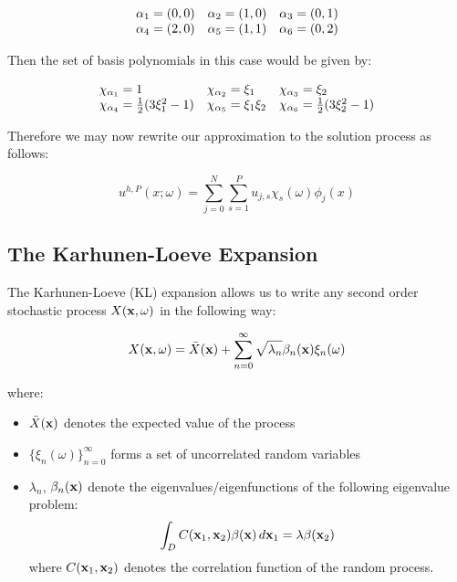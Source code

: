 \begin{equation}
  \begin{array}{c c c }
    \alpha_1 = (0,0) & \alpha_2 = (1,0) & \alpha_3 = (0,1) \\
    \alpha_4 = (2,0) & \alpha_5 = (1,1) & \alpha_6 = (0,2)
  \end{array}
\end{equation}

Then the set of basis polynomials in this case would be given by:

\begin{equation}
  \begin{array}{l l l}
    \chi_{\alpha_1} = 1 & \chi_{\alpha_2} = \xi_1 & \chi_{\alpha_3} = \xi_2 \\
    \chi_{\alpha_4} = \frac{1}{2}(3\xi_1^2 - 1) &
    \chi_{\alpha_5} = \xi_1\xi_2 &
    \chi_{\alpha_6} = \frac{1}{2}(3\xi_2^2 - 1)
  \end{array}
\end{equation}

Therefore we may now rewrite our approximation to the solution process
 as follows:

\begin{equation}\label{eq:oned-stochastic-uhp}
    u^{h,P}(x;\omega) = \sum_{j=0}^N\sum_{s=1}^Pu_{j,s}\chi_s(\omega)\phi_j(x)
\end{equation}

\subsection{The Karhunen-Loeve Expansion}

The Karhunen-Loeve (KL) expansion allows us to write any second order
stochastic process $X(\mathbf{x},\omega)$ in the following way:

\begin{equation}
    X(\mathbf{x}, \omega) = \bar{X}(\mathbf{x})
    + \sum_{n = 0}^\infty\sqrt{\lambda_n}\beta_n(\mathbf{x})\xi_n(\omega)
\end{equation}

where:

\begin{itemize}
    \item $\bar{X}(\mathbf{x})$ denotes the expected value of the process
    \item $\{\xi_n(\omega)\}_{n=0}^\infty$ forms a set of uncorrelated random
          variables
    \item $\lambda_n$, $\beta_n(\mathbf{x})$ denote the eigenvalues/eigenfunctions
          of the following eigenvalue problem:
          \[
                \int_DC(\mathbf{x}_1, \mathbf{x}_2)\beta(\mathbf{x})\, d\mathbf{x}_1
                = \lambda\beta(\mathbf{x}_2)
          \]
          where $C(\mathbf{x}_1,\mathbf{x}_2)$ denotes the correlation function of the
          random process.
\end{itemize}

